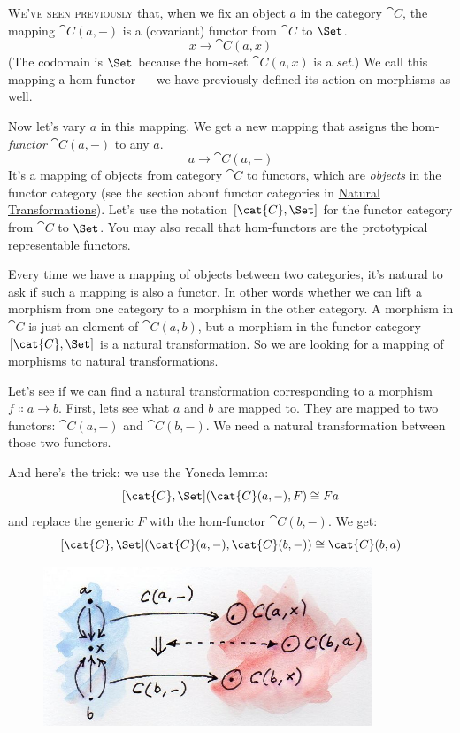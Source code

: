 \lettrine[lhang=0.17]{W}{e've seen previously} that, when we fix an object $a$ in the
category $\cat{C}$, the mapping $\cat{C}(a, -)$ is a (covariant)
functor from $\cat{C}$ to $\Set$.
\[x \to \cat{C}(a, x)\]
(The codomain is $\Set$ because the hom-set $\cat{C}(a, x)$ is a
\emph{set}.) We call this mapping a hom-functor --- we have previously
defined its action on morphisms as well.

Now let's vary $a$ in this mapping. We get a new mapping that
assigns the hom-\emph{functor} $\cat{C}(a, -)$ to any $a$.
\[a \to \cat{C}(a, -)\]
It's a mapping of objects from category $\cat{C}$ to functors, which are
\emph{objects} in the functor category (see the section about functor
categories in
\hyperref[natural-transformations]{Natural
Transformations}). Let's use the notation $[\cat{C}, \Set]$ for the
functor category from $\cat{C}$ to $\Set$. You may also recall that
hom-functors are the prototypical
\hyperref[representable-functors]{representable
functors}.

Every time we have a mapping of objects between two categories, it's
natural to ask if such a mapping is also a functor. In other words
whether we can lift a morphism from one category to a morphism in the
other category. A morphism in $\cat{C}$ is just an element of
$\cat{C}(a, b)$, but a morphism in the functor category
$[\cat{C}, \Set]$ is a natural transformation. So we are looking
for a mapping of morphisms to natural transformations.

Let's see if we can find a natural transformation corresponding to a
morphism $f \Colon a \to b$. First, lets see what
$a$ and $b$ are mapped to. They are mapped to two
functors: $\cat{C}(a, -)$ and $\cat{C}(b, -)$. We need a natural
transformation between those two functors.

And here's the trick: we use the Yoneda lemma:
\[[\cat{C}, \Set](\cat{C}(a, -), F) \cong F a\]
and replace the generic $F$ with the hom-functor
$\cat{C}(b, -)$. We get:
\[[\cat{C}, \Set](\cat{C}(a, -), \cat{C}(b, -)) \cong \cat{C}(b, a)\]
\begin{figure}[H]
\centering
\includegraphics[width=3.87500in]{images/yoneda-embedding.jpg}
\end{figure}

